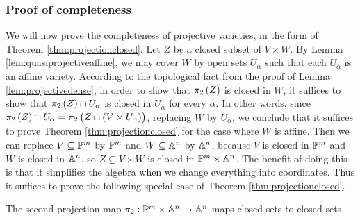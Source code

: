 \subsubsection{Proof of completeness}

We will now prove the completeness of projective varieties, in the form of Theorem \ref{thm:projectionclosed}. Let $ Z $ be a closed subset of $ V \times W $. By Lemma \ref{lem:quasiprojectiveaffine}, we may cover $ W $ by open sets $ U_\alpha $ such that each $ U_\alpha $ is an affine variety. According to the topological fact from the proof of Lemma \ref{lem:projectivedense}, in order to show that $ \pi_2\br{Z} $ is closed in $ W $, it suffices to show that $ \pi_2\br{Z} \cap U_\alpha $ is closed in $ U_\alpha $ for every $ \alpha $. In other words, since $ \pi_2\br{Z} \cap U_\alpha = \pi_2\br{Z \cap \br{V \times U_\alpha}} $, replacing $ W $ by $ U_\alpha $, we conclude that it suffices to prove Theorem \ref{thm:projectionclosed} for the case where $ W $ is affine. Then we can replace $ V \subseteq \PP^m $ by $ \PP^m $ and $ W \subseteq \AA^n $ by $ \AA^n $, because $ V $ is closed in $ \PP^m $ and $ W $ is closed in $ \AA^n $, so $ Z \subseteq V \times W $ is closed in $ \PP^m \times \AA^n $. The benefit of doing this is that it simplifies the algebra when we change everything into coordinates. Thus it suffices to prove the following special case of Theorem \ref{thm:projectionclosed}.

\begin{theorem}
\label{thm:projectionclosed2}
The second projection map $ \pi_2 : \PP^m \times \AA^n \to \AA^n $ maps closed sets to closed sets.
\end{theorem}

